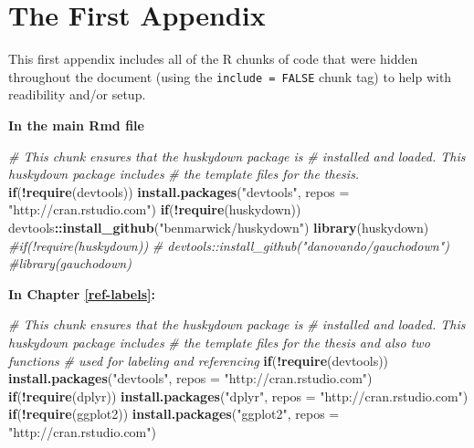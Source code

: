 \documentclass[twoside,12pt,final]{ucthesis-CA2012}
\newenvironment{Shaded}{}{}
\newcommand{\KeywordTok}[1]{\textcolor[rgb]{0.00,0.44,0.13}{\textbf{{#1}}}}
\newcommand{\DataTypeTok}[1]{\textcolor[rgb]{0.56,0.13,0.00}{{#1}}}
\newcommand{\StringTok}[1]{\textcolor[rgb]{0.25,0.44,0.63}{{#1}}}
\newcommand{\CommentTok}[1]{\textcolor[rgb]{0.38,0.63,0.69}{\textit{{#1}}}}
\newcommand{\NormalTok}[1]{{#1}}
\newcommand{\OperatorTok}[1]{\textcolor[rgb]{0.00,0.44,0.13}{\textbf{{#1}}}}
\newcommand{\ControlFlowTok}[1]{\textcolor[rgb]{0.00,0.44,0.13}{\textbf{{#1}}}}
\begin{document}
\begin{ucmainmatter}
\hypertarget{the-first-appendix}{%
\chapter{The First Appendix}\label{the-first-appendix}}

This first appendix includes all of the R chunks of code that were
hidden throughout the document (using the \texttt{include\ =\ FALSE}
chunk tag) to help with readibility and/or setup.

\textbf{In the main Rmd file}
\begin{Shaded}
\begin{Highlighting}[]
\CommentTok{# This chunk ensures that the huskydown package is}
\CommentTok{# installed and loaded. This huskydown package includes}
\CommentTok{# the template files for the thesis.}
\ControlFlowTok{if}\NormalTok{(}\OperatorTok{!}\KeywordTok{require}\NormalTok{(devtools))}
  \KeywordTok{install.packages}\NormalTok{(}\StringTok{"devtools"}\NormalTok{, }\DataTypeTok{repos =} \StringTok{"http://cran.rstudio.com"}\NormalTok{)}
\ControlFlowTok{if}\NormalTok{(}\OperatorTok{!}\KeywordTok{require}\NormalTok{(huskydown))}
\NormalTok{  devtools}\OperatorTok{::}\KeywordTok{install_github}\NormalTok{(}\StringTok{"benmarwick/huskydown"}\NormalTok{)}
\KeywordTok{library}\NormalTok{(huskydown)}
\CommentTok{#if(!require(huskydown))}
\CommentTok{#  devtools::install_github("danovando/gauchodown")}
\CommentTok{#library(gauchodown)}
\end{Highlighting}
\end{Shaded}
\textbf{In Chapter \ref{ref-labels}:}
\begin{Shaded}
\begin{Highlighting}[]
\CommentTok{# This chunk ensures that the huskydown package is}
\CommentTok{# installed and loaded. This huskydown package includes}
\CommentTok{# the template files for the thesis and also two functions}
\CommentTok{# used for labeling and referencing}
\ControlFlowTok{if}\NormalTok{(}\OperatorTok{!}\KeywordTok{require}\NormalTok{(devtools))}
  \KeywordTok{install.packages}\NormalTok{(}\StringTok{"devtools"}\NormalTok{, }\DataTypeTok{repos =} \StringTok{"http://cran.rstudio.com"}\NormalTok{)}
\ControlFlowTok{if}\NormalTok{(}\OperatorTok{!}\KeywordTok{require}\NormalTok{(dplyr))}
    \KeywordTok{install.packages}\NormalTok{(}\StringTok{"dplyr"}\NormalTok{, }\DataTypeTok{repos =} \StringTok{"http://cran.rstudio.com"}\NormalTok{)}
\ControlFlowTok{if}\NormalTok{(}\OperatorTok{!}\KeywordTok{require}\NormalTok{(ggplot2))}
    \KeywordTok{install.packages}\NormalTok{(}\StringTok{"ggplot2"}\NormalTok{, }\DataTypeTok{repos =} \StringTok{"http://cran.rstudio.com"}\NormalTok{)}

\end{Highlighting}
\end{Shaded}
\end{ucmainmatter}
\end{document}
